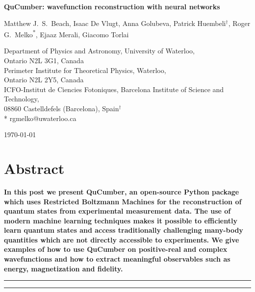 \documentclass[submission, Phys]{SciPost}
\begin{document}
\begin{center}{\Large \textbf{
	QuCumber: wavefunction reconstruction with neural networks
}}\end{center}

\begin{center}
	Matthew J.~S.~Beach,
	Isaac De Vlugt,
	Anna Golubeva,
	Patrick Huembeli$^\dag$,
	Roger G.~Melko\textsuperscript{*},
	Ejaaz Merali,
	Giacomo Torlai
\end{center}

\begin{center}
	Department of Physics and Astronomy, University of Waterloo,
	\\Ontario N2L 3G1, Canada
	\\
	Perimeter Institute for Theoretical Physics, Waterloo,
	\\Ontario N2L 2Y5, Canada
	\\
	ICFO-Institut de Ciencies Fotoniques, Barcelona Institute of Science and Technology,
	\\08860 Castelldefels (Barcelona), Spain$^\dag$ \\
	* rgmelko@uwaterloo.ca \\
\end{center}

\begin{center}
	\today
\end{center}


\section*{Abstract}
{\bf
In this post we present QuCumber, an open-source Python package which uses Restricted Boltzmann Machines 
for the reconstruction of quantum states from experimental measurement data. 
The use of modern machine learning techniques makes it possible to efficiently learn quantum states 
and access traditionally challenging many-body quantities which are not directly accessible to experiments. 
We give examples of how to use QuCumber on positive-real and complex wavefunctions 
and how to extract meaningful observables such as energy, magnetization and fidelity.
}

\vspace{10pt}
\noindent\rule{\textwidth}{1pt}
\tableofcontents\thispagestyle{fancy}
\noindent\rule{\textwidth}{1pt}
\vspace{10pt}
\end{document}
